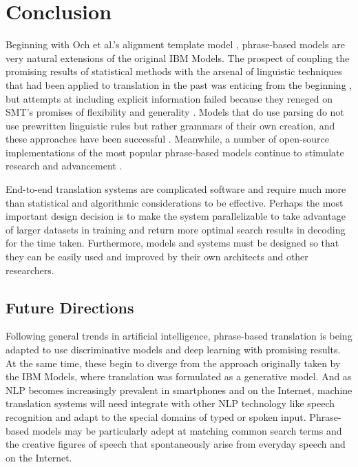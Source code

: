 \documentclass[11pt]{article}
\begin{document}
\section{Conclusion}

Beginning with Och et al.'s alignment template model \cite{och:99}, phrase-based models
are very natural extensions of the original IBM Models. The prospect of coupling
the promising results of statistical methods with the arsenal of linguistic techniques
that had been applied to translation in the past was enticing from the beginning \cite{brown:93},
but attempts at including explicit information failed because they reneged on
SMT's promises of flexibility and generality \cite{yamada_knight, koehn:03}.
Models that do use parsing do not use prewritten linguistic rules but
rather grammars of their own creation, and these approaches have been successful \cite{chiang:07, joshua}.
Meanwhile, a number of open-source implementations of the most popular phrase-based models
continue to stimulate research and advancement \cite{moses, joshua}.

End-to-end translation systems are complicated software and require
much more than statistical and algorithmic considerations to be effective.
Perhaps the most important design decision is to make the system parallelizable
to take advantage of larger datasets in training and return more optimal
search results in decoding for the time taken. Furthermore, models and systems
must be designed so that they can be easily used and improved by their own architects
and other researchers.

\subsection{Future Directions}
Following general trends in artificial intelligence, phrase-based translation is being adapted
to use discriminative models \cite{chiang:07} and deep learning \cite{neural-nets} with promising results.
At the same time, these begin to diverge from the approach originally taken by the IBM Models,
where translation was formulated as a generative model.
And as NLP becomes increasingly prevalent in smartphones and on the Internet, machine translation
systems will need integrate with other NLP technology like speech recognition and adapt
to the special domains of typed or spoken input.
Phrase-based models may be particularly adept at matching common search terms
and the creative figures of speech that spontaneously arise from everyday speech and on the Internet.
\end{document}
